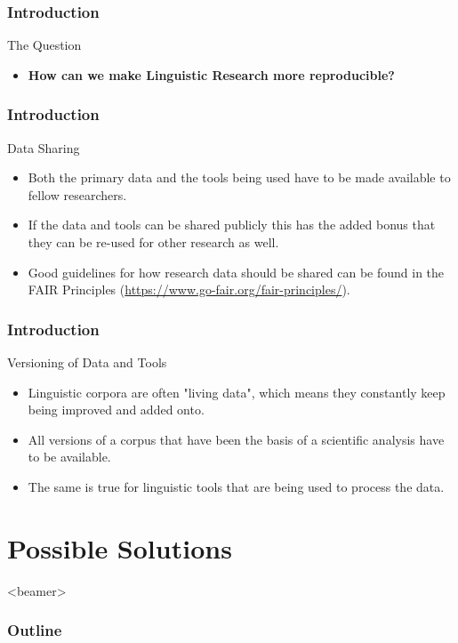 	\begin{frame}
		\frametitle{Introduction}
		\begin{block}{The Question}
			\begin{itemize}
				\pause
				\bigskip
				\item \textbf{How can we make Linguistic Research more reproducible?}
				\bigskip
		   \end{itemize}
	   \end{block}
	\end{frame}

    \begin{frame}
        \frametitle{Introduction}
        \begin{block}{Data Sharing}
            \begin{itemize}
				\item Both the primary data and the tools being used have to be made available to fellow researchers.
				\pause
				\item If the data and tools can be shared publicly this has the added bonus that they can be re-used for other research as well.
				\pause
				\item Good guidelines for how research data should be shared can be found in the FAIR Principles (\url{https://www.go-fair.org/fair-principles/}).
	     	\end{itemize}
        \end{block}
    \end{frame}


	\begin{frame}
        \frametitle{Introduction}
        \begin{block}{Versioning of Data and Tools}
            \begin{itemize}
				\item Linguistic corpora are often "living data", which means they constantly keep being improved and added onto.
				\pause
				\item All versions of a corpus that have been the basis of a scientific analysis have to be available.
				\pause
				\item The same is true for linguistic tools that are being used to process the data.
	     	\end{itemize}
        \end{block}
    \end{frame}

\section[p.two]{Possible Solutions}
{%
\begin{frame}<beamer>
    \frametitle{Outline}
\tableofcontents[currentsection]
\end{frame}
}

